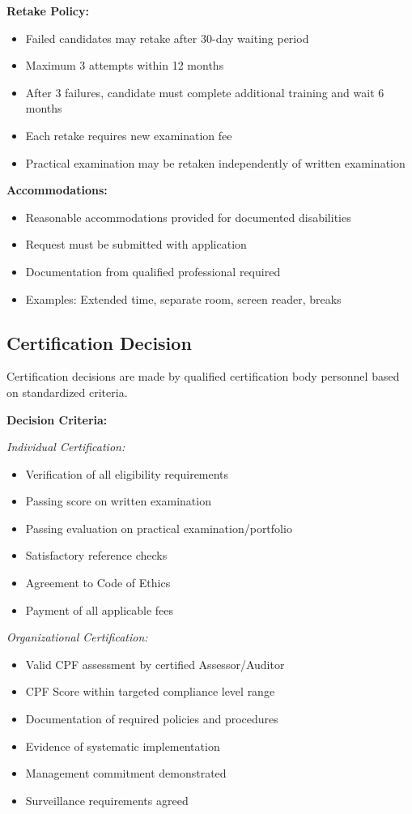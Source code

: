 \documentclass[11pt,a4paper]{article}
\begin{document}
\textbf{Retake Policy:}
\begin{itemize}
\item Failed candidates may retake after 30-day waiting period
\item Maximum 3 attempts within 12 months
\item After 3 failures, candidate must complete additional training and wait 6 months
\item Each retake requires new examination fee
\item Practical examination may be retaken independently of written examination
\end{itemize}

\textbf{Accommodations:}
\begin{itemize}
\item Reasonable accommodations provided for documented disabilities
\item Request must be submitted with application
\item Documentation from qualified professional required
\item Examples: Extended time, separate room, screen reader, breaks
\end{itemize}

\subsection{Certification Decision}

Certification decisions are made by qualified certification body personnel based on standardized criteria.

\textbf{Decision Criteria:}

\textit{Individual Certification:}
\begin{itemize}
\item Verification of all eligibility requirements
\item Passing score on written examination
\item Passing evaluation on practical examination/portfolio
\item Satisfactory reference checks
\item Agreement to Code of Ethics
\item Payment of all applicable fees
\end{itemize}

\textit{Organizational Certification:}
\begin{itemize}
\item Valid CPF assessment by certified Assessor/Auditor
\item CPF Score within targeted compliance level range
\item Documentation of required policies and procedures
\item Evidence of systematic implementation
\item Management commitment demonstrated
\item Surveillance requirements agreed
\end{itemize}
\end{document}
